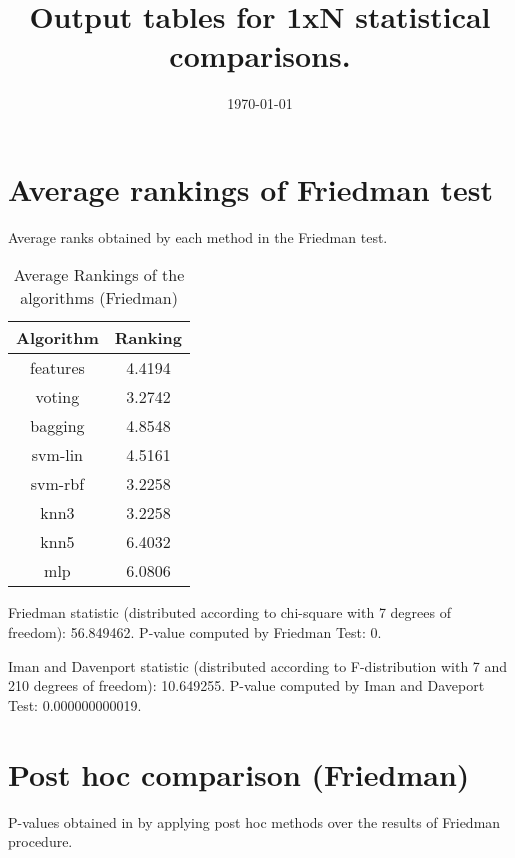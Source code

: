 \documentclass[a4paper,10pt]{article}
\title{Output tables for 1xN statistical comparisons.}
\author{}
\date{\today}
\begin{document}
\begin{landscape}
\pagestyle{empty}
\maketitle
\thispagestyle{empty}

\section{Average rankings of Friedman test}


Average ranks obtained by each method in the Friedman test.

\begin{table}[!htp]
\centering
\begin{tabular}{|c|c|}\hline
Algorithm&Ranking\\\hline
features&4.4194\\voting&3.2742\\bagging&4.8548\\svm-lin&4.5161\\svm-rbf&3.2258\\knn3&3.2258\\knn5&6.4032\\mlp&6.0806\\\hline\end{tabular}
\caption{Average Rankings of the algorithms (Friedman)}
\end{table}

Friedman statistic (distributed according to chi-square with 7 degrees of freedom): 56.849462. \newline P-value computed by Friedman Test: 0.\newline

Iman and Davenport statistic (distributed according to F-distribution with 7 and 210 degrees of freedom): 10.649255. \newline P-value computed by Iman and Daveport Test: 0.000000000019.\newline


\newpage

\section{Post hoc comparison (Friedman)}


P-values obtained in by applying post hoc methods over the results of Friedman procedure.


\end{landscape}
\end{document}
